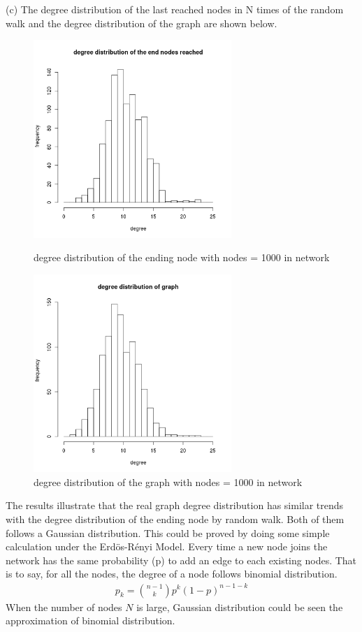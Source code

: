 \documentclass[draftcls,12pt,onecolumn]{IEEEtran}
\begin{document}
(c) The degree distribution of the last reached nodes in N times of the random walk and the degree distribution of the graph are shown below.
\begin{figure}[htbp]
\centering
\begin{minipage}[t]{0.48\textwidth}
\centering
\includegraphics[width=7.5cm]{2_1_c_end_nodes_degree.png}
\caption{degree distribution of the ending node with nodes = 1000 in network}
\end{minipage}
\begin{minipage}[t]{0.48\textwidth}
\centering
\includegraphics[width=7.5cm]{2_1_c_graph_degree.png}
\caption{degree distribution of the graph with nodes = 1000 in network}
\end{minipage}
\end{figure}

The results illustrate that the real graph degree distribution has similar trends with the degree distribution of the ending node by random walk. Both of them follows a Gaussian distribution. This could be proved by doing some simple calculation under the Erd\"os-R\'enyi Model. Every time a new node joins the network has the same probability (p) to add an edge to each existing nodes. That is to say, for all the nodes, the degree of a node follows binomial distribution.
 \begin{align}
 p_{k} = \binom{n-1}{k} p^{k} (1-p) ^{n-1-k}
 \end{align}
 When the number of nodes $N$ is large, Gaussian distribution could be seen the approximation of binomial distribution. 
\end{document}
